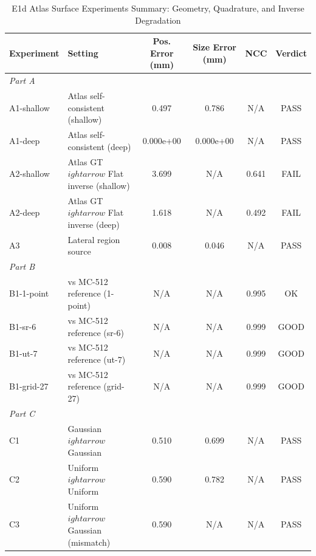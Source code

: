 \begin{table}[t]
\centering
\caption{E1d Atlas Surface Experiments Summary: Geometry, Quadrature, and Inverse Degradation}
\label{tab:e1d_summary}
\begin{tabular}{llcccc}
\toprule
Experiment & Setting & Pos. Error (mm) & Size Error (mm) & NCC & Verdict \\
\midrule
\multicolumn{6}{l}{\textit{Part A}} \\
A1-shallow & Atlas self-consistent (shallow) & 0.497 & 0.786 & N/A & PASS \\
A1-deep & Atlas self-consistent (deep) & 0.000e+00 & 0.000e+00 & N/A & PASS \\
A2-shallow & Atlas GT $
ightarrow$ Flat inverse (shallow) & 3.699 & N/A & 0.641 & FAIL \\
A2-deep & Atlas GT $
ightarrow$ Flat inverse (deep) & 1.618 & N/A & 0.492 & FAIL \\
A3 & Lateral region source & 0.008 & 0.046 & N/A & PASS \\
\midrule
\multicolumn{6}{l}{\textit{Part B}} \\
B1-1-point & vs MC-512 reference (1-point) & N/A & N/A & 0.995 & OK \\
B1-sr-6 & vs MC-512 reference (sr-6) & N/A & N/A & 0.999 & GOOD \\
B1-ut-7 & vs MC-512 reference (ut-7) & N/A & N/A & 0.999 & GOOD \\
B1-grid-27 & vs MC-512 reference (grid-27) & N/A & N/A & 0.999 & GOOD \\
\midrule
\multicolumn{6}{l}{\textit{Part C}} \\
C1 & Gaussian $
ightarrow$ Gaussian & 0.510 & 0.699 & N/A & PASS \\
C2 & Uniform $
ightarrow$ Uniform & 0.590 & 0.782 & N/A & PASS \\
C3 & Uniform $
ightarrow$ Gaussian (mismatch) & 0.590 & N/A & N/A & PASS \\
\bottomrule
\end{tabular}
\end{table}
